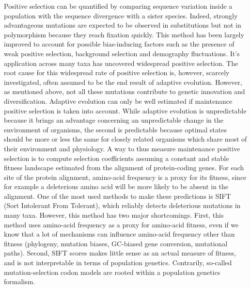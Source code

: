 \documentclass{article}
\begin{document}
    Positive selection can be quantified by comparing sequence variation inside a population with the sequence divergence with a sister species\cite{mcdonald_adaptative_1991}.
    Indeed, strongly advantageous mutations are expected to be observed in substitutions but not in polymorphism because they reach fixation quickly.
    This method has been largely improved to account for possible bias-inducing factors such as the presence of weak positive selection, background selection and demography fluctuations\cite{eyre-walker_distribution_2006, eyre-walker_estimating_2009, galtier_adaptive_2016, tataru_inference_2017}.
    It's application across many taxa has uncovered widespread positive selection\cite{moutinho_variation_2019}.
    The root cause for this widespread rate of positive selection is, however, scarcely investigated, often assumed to be the end result of adaptive evolution.
    However, as mentioned above, not all these mutations contribute to genetic innovation and diversification.
    Adaptive evolution can only be well estimated if maintenance positive selection is taken into account.
    While adaptive evolution is unpredictable because it brings an advantage concerning an unpredictable change in the environment of organisms, the second is predictable because optimal states should be more or less the same for closely related organisms which share most of their environment and physiology.
    A way to thus measure maintenance positive selection is to compute selection coefficients assuming a constant and stable fitness landscape estimated from the alignment of protein-coding genes.
    For each site of the protein alignment, amino-acid frequency is a proxy for its fitness, since for example a deleterious amino acid will be more likely to be absent in the alignment.
    One of the most used methods to make these predictions is SIFT (Sort Intolerant From Tolerant), which reliably detects deleterious mutations in many taxa\cite{ng_sift_2003, vaser_sift_2016}.
    However, this method has two major shortcomings.
    First, this method uses amino-acid frequency as a proxy for amino-acid fitness, even if we know that a lot of mechanisms can influence amino-acid frequency other than fitness (phylogeny, mutation biases, GC-biased gene conversion, mutational paths).
    Second, SIFT scores makes little sense as an actual measure of fitness, and is not interpretable in terms of population genetics.
    Contrarily, so-called mutation-selection codon models are rooted within a population genetics formalism\cite{halpern_evolutionary_1998, mccandlish_modeling_2014}.
\end{document}
